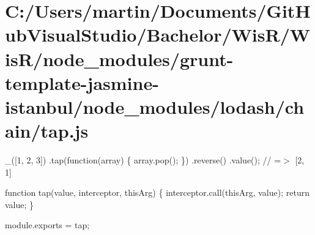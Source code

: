 \hypertarget{_c_1_2_users_2martin_2_documents_2_git_hub_visual_studio_2_bachelor_2_wis_r_2_wis_r_2node_module6be375f056f9361be9351ce9fcbacd0f}{}\section{C\+:/\+Users/martin/\+Documents/\+Git\+Hub\+Visual\+Studio/\+Bachelor/\+Wis\+R/\+Wis\+R/node\+\_\+modules/grunt-\/template-\/jasmine-\/istanbul/node\+\_\+modules/lodash/chain/tap.\+js}
\+\_\+(\mbox{[}1, 2, 3\mbox{]}) .tap(function(array) \{ array.\+pop(); \}) .reverse() .value(); // =$>$ \mbox{[}2, 1\mbox{]}


\begin{DoxyCodeInclude}

\textcolor{keyword}{function} tap(value, interceptor, thisArg) \{
  interceptor.call(thisArg, value);
  \textcolor{keywordflow}{return} value;
\}

module.exports = tap;
\end{DoxyCodeInclude}
 